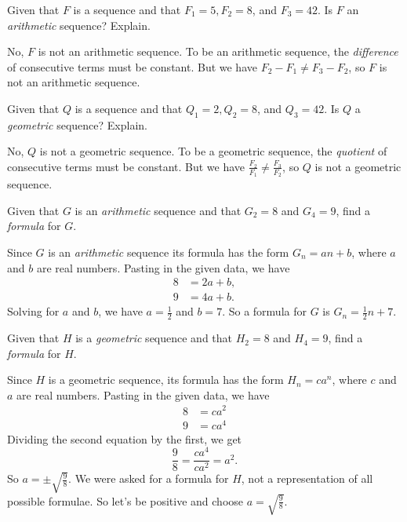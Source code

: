 \documentclass[12pt,fleqn,answers]{exam}
\begin{document}
\begin{questions} 

\question Given that $F$ is a sequence and that $F_1 = 5, F_2 = 8$, and $F_3 = 42$.
Is $F$ an  \emph{arithmetic} sequence? Explain.

\begin{solution}[2.25in] No, $F$ is not an arithmetic sequence. To be an
  arithmetic sequence, the \emph{difference} of consecutive terms must be constant.
  But we have $F_2 - F_1 \neq F_3 - F_2$, so $F$ is not an arithmetic sequence.

\end{solution}

\question Given that $Q$ is a sequence and that $Q_1 =2, Q_2 = 8$, and $Q_3 = 42$.
Is $Q$ a  \emph{geometric} sequence? Explain.

\begin{solution}[2.25in] No, $Q$ is not a geometric sequence. To be a
  geometric  sequence, the \emph{quotient} of consecutive terms must be constant.
  But we have  $\frac{F_2}{F_1}\neq \frac{F_3}{F_2}$, so $Q$ is not a
  geometric sequence.


\end{solution}

\question Given that $G$ is an \emph{arithmetic} sequence and that $G_2 = 8$ and $G_4=9$, 
find a \emph{formula} for $G$.

\begin{solution}%
  Since $G$  is an \emph{arithmetic} sequence its formula has the form $G_n = a n  + b$,
  where $a$ and $b$ are real numbers. Pasting in the given data, we have
  \begin{align*}
     8 &= 2 a + b, \\
     9 &= 4 a + b.
  \end{align*}
Solving for $a$ and $b$, we have $a=\frac{1}{2}$ and $b=7$. So a formula for $G$ is
$G_n = \frac{1}{2} n + 7$.

\end{solution}
    
\question Given that $H$ is a \emph{geometric} sequence and that $H_2 = 8$ and $H_4=9$, 
find a \emph{formula} for $H$.

\begin{solution}[2.25in]
  Since $H$ is a geometric sequence, its formula has the form $H_n = c a^n$, where $c$ 
  and $a$ are real numbers. Pasting in the given data, we have
  \begin{align*}
      8 &= c a^2 \\
      9 &= c a^4    
  \end{align*}
  Dividing the second equation by the first, we get 
  \begin{equation*}
     \frac{9}{8} = \frac{c a^4}{c a^2} = a^2.
  \end{equation*}
 So $a = \pm \sqrt{\frac{9}{8}}$. We were asked for a formula for $H$, not a representation
 of all possible formulae. So let's be positive and choose $a = \sqrt{\frac{9}{8}}$.
 

\end{solution}
\end{questions}
\end{document}
